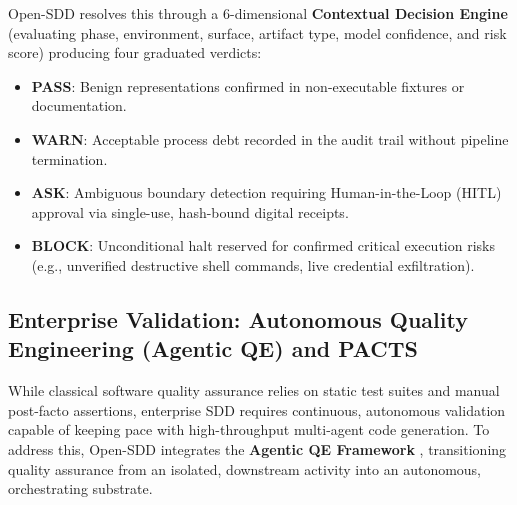 \documentclass[11pt,a4paper]{article}
\begin{document}
Open-SDD resolves this through a 6-dimensional \textbf{Contextual Decision Engine} (evaluating phase, environment, surface, artifact type, model confidence, and risk score) producing four graduated verdicts:
\begin{itemize}
    \item \textbf{PASS}: Benign representations confirmed in non-executable fixtures or documentation.
    \item \textbf{WARN}: Acceptable process debt recorded in the audit trail without pipeline termination.
    \item \textbf{ASK}: Ambiguous boundary detection requiring Human-in-the-Loop (HITL) approval via single-use, hash-bound digital receipts.
    \item \textbf{BLOCK}: Unconditional halt reserved for confirmed critical execution risks (e.g., unverified destructive shell commands, live credential exfiltration).
\end{itemize}

\subsection{Enterprise Validation: Autonomous Quality Engineering (Agentic QE) and PACTS}
While classical software quality assurance relies on static test suites and manual post-facto assertions, enterprise SDD requires continuous, autonomous validation capable of keeping pace with high-throughput multi-agent code generation. To address this, Open-SDD integrates the \textbf{Agentic QE Framework} \cite{spiridonov2026agentic}, transitioning quality assurance from an isolated, downstream activity into an autonomous, orchestrating substrate.
\end{document}
